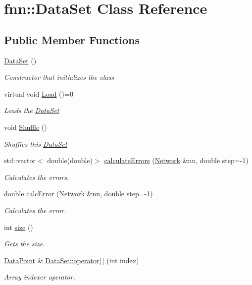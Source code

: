 \hypertarget{classfnn_1_1_data_set}{}\section{fnn\+:\+:Data\+Set Class Reference}
\label{classfnn_1_1_data_set}
\subsection*{Public Member Functions}
\begin{DoxyCompactItemize}
\item 
\hyperlink{classfnn_1_1_data_set_a12ed322c69f9106ae653a0982962b806}{Data\+Set} ()
\begin{DoxyCompactList}\small\item\em Constructor that initializes the class\end{DoxyCompactList}\item 
virtual void \hyperlink{classfnn_1_1_data_set_a60bf738959367e5c5cd7083faf36ba16}{Load} ()=0
\begin{DoxyCompactList}\small\item\em Loads the \hyperlink{classfnn_1_1_data_set}{Data\+Set} \end{DoxyCompactList}\item 
void \hyperlink{classfnn_1_1_data_set_a4e8641f5a0021f7de691bd4732a87f4a}{Shuffle} ()
\begin{DoxyCompactList}\small\item\em Shuffles this \hyperlink{classfnn_1_1_data_set}{Data\+Set} \end{DoxyCompactList}\item 
std\+::vector$<$ double(double)$>$ \hyperlink{classfnn_1_1_data_set_a61e28346ab4397ff19dd948f145ed3be}{calculate\+Errors} (\hyperlink{classfnn_1_1_network}{Network} \&nn, double step=-\/1)
\begin{DoxyCompactList}\small\item\em Calculates the errors. \end{DoxyCompactList}\item 
double \hyperlink{classfnn_1_1_data_set_a95420316abad952a09a296a74cbf4f4c}{calc\+Error} (\hyperlink{classfnn_1_1_network}{Network} \&nn, double step=-\/1)
\begin{DoxyCompactList}\small\item\em Calculates the error. \end{DoxyCompactList}\item 
int \hyperlink{classfnn_1_1_data_set_a6c6356888b37613565ace7f9b4d8bc16}{size} ()
\begin{DoxyCompactList}\small\item\em Gets the size. \end{DoxyCompactList}\item 
\hyperlink{structfnn_1_1_data_point}{Data\+Point} \& \hyperlink{classfnn_1_1_data_set_abc82742f562f79d0424bc74255343258}{Data\+Set\+::operator\mbox{[}$\,$\mbox{]}} (int index)
\begin{DoxyCompactList}\small\item\em Array indexer operator. \end{DoxyCompactList}\end{DoxyCompactItemize}


